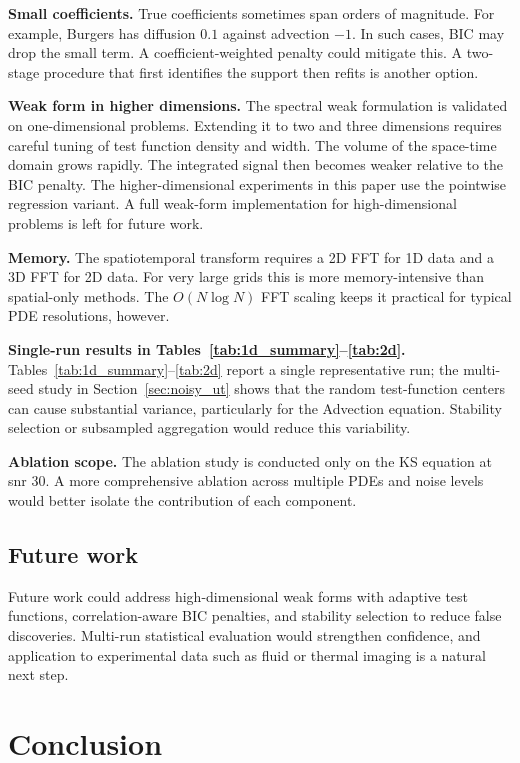 \documentclass[preprint,12pt]{elsarticle}
\begin{document}
\textbf{Small coefficients.} True coefficients sometimes span orders of magnitude. For example, Burgers has diffusion $0.1$ against advection $-1$. In such cases, BIC may drop the small term. A coefficient-weighted penalty could mitigate this. A two-stage procedure that first identifies the support then refits is another option.

\textbf{Weak form in higher dimensions.} The spectral weak formulation is validated on one-dimensional problems. Extending it to two and three dimensions requires careful tuning of test function density and width. The volume of the space-time domain grows rapidly. The integrated signal then becomes weaker relative to the BIC penalty. The higher-dimensional experiments in this paper use the pointwise regression variant. A full weak-form implementation for high-dimensional problems is left for future work.

\textbf{Memory.} The spatiotemporal transform requires a 2D FFT for 1D data and a 3D FFT for 2D data. For very large grids this is more memory-intensive than spatial-only methods. The $O(N\log N)$ FFT scaling keeps it practical for typical PDE resolutions, however.

\textbf{Single-run results in Tables~\ref{tab:1d_summary}--\ref{tab:2d}.} Tables~\ref{tab:1d_summary}--\ref{tab:2d} report a single representative run; the multi-seed study in Section~\ref{sec:noisy_ut} shows that the random test-function centers can cause substantial variance, particularly for the Advection equation. Stability selection or subsampled aggregation would reduce this variability.

\textbf{Ablation scope.} The ablation study is conducted only on the KS equation at snr 30. A more comprehensive ablation across multiple PDEs and noise levels would better isolate the contribution of each component.

\subsection{Future work}

Future work could address high-dimensional weak forms with adaptive test functions, correlation-aware BIC penalties, and stability selection to reduce false discoveries. Multi-run statistical evaluation would strengthen confidence, and application to experimental data such as fluid or thermal imaging is a natural next step.

\section{Conclusion}
\label{sec:conclusion}
\end{document}
